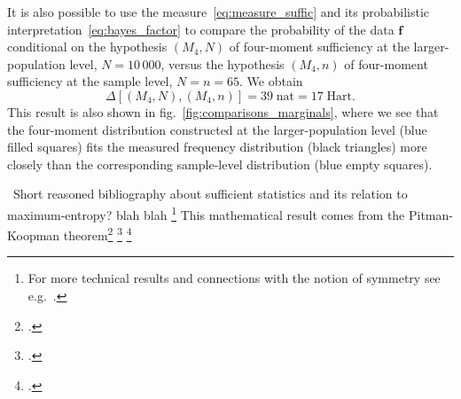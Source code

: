 \documentclass[\ifafour a4paper,12pt,\else a5paper,10pt,\fi%
onecolumn,oneside,article,%
british%
]{memoir}
\theoremstyle{remark}
\theoremstyle{innote}
\newcommand*{\citep}{\footcites}
\renewcommand*{\|}{\nonscript\,\vert\nonscript\;\mathopen{}}
\newcommand*{\sect}{\S}%
\newcommand*{\fig}{fig.}%
\newcommand*{\eg}{{e.g.}}
\newcommand*{\puzzle}{{\fontencoding{U}\fontfamily{fontawesometwo}\selectfont\symbol{225}}}
\newcommand{\mynote}[1]{ {\color{notecolour}\puzzle\ #1}}
\newcommand*{\yff}{f}
\newcommand*{\yf}{\bm{\yff}}
\newcommand*{\ydi}{\varDelta}
\newcommand*{\nat}{\textrm{nat}}
\newcommand*{\hart}{\textrm{Hart}}
\begin{document}
It is also possible to use the measure~\eqref{eq:measure_suffic} and its
probabilistic interpretation~\eqref{eq:bayes_factor} to compare the probability of
the data $\yf$ conditional on the hypothesis $(M_{4},N)$ of four-moment
sufficiency at the larger-population level, $N=10\,000$, versus the
hypothesis $(M_{4}, n)$ of four-moment sufficiency at the sample level,
$N=n=65$. We obtain
\begin{equation}
  \label{eq:diff_suff_n}
  \ydi[(M_{4}, N), (M_{4}, n)] = 39\;\nat = 17\;\hart.
\end{equation}
This result is also shown in
\fig~\ref{fig:comparisons_marginals}, where we see that the four-moment
distribution constructed at the larger-population level
(\textcolor{myblue}{blue filled squares}) fits the measured frequency
distribution (black triangles) more closely than the corresponding
sample-level distribution (\textcolor{myblue}{blue empty squares}).



\bigskip
\mynote{Short reasoned bibliography about sufficient statistics and its
  relation to maximum-entropy?} blah blah \footnote{For more technical results and
  connections with the notion of symmetry see \eg\
  \cite{darmois1935,neyman1935,koopman1936,pitman1936,halmosetal1949,bahadur1954,berk1972,lauritzen1974,lauritzen1982_r1988,lauritzen2007,cifarellietal1980,cifarellietal1981,diaconisetal1981,diaconis1992,furmanczyketal1998,fortinietal2000,nogalesetal2000,kallenberg2005,ayetal2015}.}
This mathematical result comes from the Pitman-Koopman
theorem\citep{cifarellietal1982,kullbacketal1951}[the
notion goes back to][]{fisher1922} \citep{jaynes1982b}[\sect~4.5.4]{bernardoetal1994}
\citep{koopman1936,pitman1936,darmois1935}[for later analyses and the
discrete case
see][]{hipp1974,andersen1970,denny1967,denny1972,fraser1963,barankinetal1963,barndorffnielsen1978_r2014}
\end{document}
